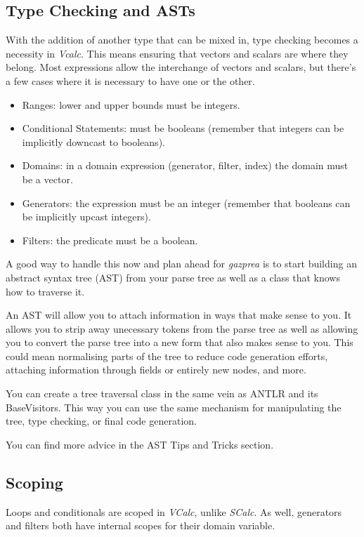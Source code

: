 \documentclass{article}
\begin{document}
\subsection{Type Checking and ASTs}
With the addition of another type that can be mixed in, type checking becomes a necessity in
\textit{Vcalc}. This means ensuring that vectors and scalars are where they belong. Most expressions
allow the interchange of vectors and scalars, but there's a few cases where it is necessary to have
one or the other.
\begin{itemize}
  \item
    Ranges: lower and upper bounds must be integers.
  \item
    Conditional Statements: must be booleans (remember that integers can be implicitly downcast to
    booleans).
  \item
    Domains: in a domain expression (generator, filter, index) the domain must be a vector.
  \item
    Generators: the expression must be an integer (remember that booleans can be implicitly upcast
    integers).
  \item
    Filters: the predicate must be a boolean.
\end{itemize}

A good way to handle this now and plan ahead for \textit{gazprea} is to start building an abstract
syntax tree (AST) from your parse tree as well as a class that knows how to traverse it.

An AST will allow you to attach information in ways that make sense to you. It allows you to strip
away unecessary tokens from the parse tree as well as allowing you to convert the parse tree into a
new form that also makes sense to you. This could mean normalising parts of the tree to reduce code
generation efforts, attaching information through fields or entirely new nodes, and more.

You can create a tree traversal class in the same vein as ANTLR and its BaseVisitors. This way you
can use the same mechanism for manipulating the tree, type checking, or final code generation.

You can find more advice in the AST Tips and Tricks section.

\subsection{Scoping}
Loops and conditionals are scoped in \textit{VCalc}, unlike \textit{SCalc}. As well, generators and
filters both have internal scopes for their domain variable.
\end{document}
